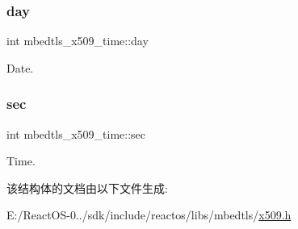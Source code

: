 \subsubsection{\texorpdfstring{day}{day}}
{\footnotesize\ttfamily int mbedtls\+\_\+x509\+\_\+time\+::day}

Date. \mbox{\label{structmbedtls__x509__time_a267d51d8fbecde50b06b883db7f98ec2}} 
\subsubsection{\texorpdfstring{sec}{sec}}
{\footnotesize\ttfamily int mbedtls\+\_\+x509\+\_\+time\+::sec}

Time. 

该结构体的文档由以下文件生成\+:\begin{DoxyCompactItemize}
\item 
E\+:/\+React\+O\+S-\/0../sdk/include/reactos/libs/mbedtls/\hyperlink{x509_8h}{x509.\+h}\end{DoxyCompactItemize}

